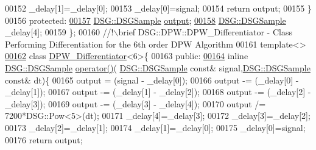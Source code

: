\begin{DoxyCode}
00152                 \_delay[1]=\_delay[0];
00153                 \_delay[0]=signal;
00154                 \textcolor{keywordflow}{return} output;
00155             \}
00156         \textcolor{keyword}{protected}:
\hypertarget{_d_p_w_8h_source_l00157}{}\hyperlink{class_d_s_g_1_1_d_p_w_1_1_d_p_w___differentiator_3_015_01_4_ae69bdfd7eb71c3c44691bda6067bda0c}{00157}             \hyperlink{namespace_d_s_g_ac39a94cd27ebcd9c1e7502d0c624894a}{DSG::DSGSample} \hyperlink{class_d_s_g_1_1_d_p_w_1_1_d_p_w___differentiator_3_015_01_4_ae69bdfd7eb71c3c44691bda6067bda0c}{output};
\hypertarget{_d_p_w_8h_source_l00158}{}\hyperlink{class_d_s_g_1_1_d_p_w_1_1_d_p_w___differentiator_3_015_01_4_afc272a1eb4f3240b4148a64c7c9ccfc1}{00158}             \hyperlink{namespace_d_s_g_ac39a94cd27ebcd9c1e7502d0c624894a}{DSG::DSGSample} \_delay[4];
00159         \};\textcolor{comment}{}
00160 \textcolor{comment}{        //!\(\backslash\)brief DSG::DPW::DPW\_Differentiator - Class Performing Differentiation for the 6th order DPW
       Algorithm}
00161 \textcolor{comment}{}        \textcolor{keyword}{template}<>
\hypertarget{_d_p_w_8h_source_l00162}{}\hyperlink{class_d_s_g_1_1_d_p_w_1_1_d_p_w___differentiator_3_016_01_4}{00162}         \textcolor{keyword}{class }\hyperlink{class_d_s_g_1_1_d_p_w_1_1_d_p_w___differentiator}{DPW\_Differentiator}<6>\{
00163         \textcolor{keyword}{public}:
\hypertarget{_d_p_w_8h_source_l00164}{}\hyperlink{class_d_s_g_1_1_d_p_w_1_1_d_p_w___differentiator_3_016_01_4_a82356846abaeef0ed76e9803a7863f3c}{00164}             \textcolor{keyword}{inline} \hyperlink{namespace_d_s_g_ac39a94cd27ebcd9c1e7502d0c624894a}{DSG::DSGSample} \hyperlink{class_d_s_g_1_1_d_p_w_1_1_d_p_w___differentiator_3_016_01_4_a82356846abaeef0ed76e9803a7863f3c}{operator()}(
      \hyperlink{namespace_d_s_g_ac39a94cd27ebcd9c1e7502d0c624894a}{DSG::DSGSample} \textcolor{keyword}{const}& signal,\hyperlink{namespace_d_s_g_ac39a94cd27ebcd9c1e7502d0c624894a}{DSG::DSGSample} \textcolor{keyword}{const}& dt)\{
00165                 output  = (signal - \_delay[0]);
00166                 output -= (\_delay[0] - \_delay[1]);
00167                 output -= (\_delay[1] - \_delay[2]);
00168                 output -= (\_delay[2] - \_delay[3]);
00169                 output -= (\_delay[3] - \_delay[4]);
00170                 output /= 7200*DSG::Pow<5>(dt);
00171                 \_delay[4]=\_delay[3];
00172                 \_delay[3]=\_delay[2];
00173                 \_delay[2]=\_delay[1];
00174                 \_delay[1]=\_delay[0];
00175                 \_delay[0]=signal;
00176                 \textcolor{keywordflow}{return} output;

\end{DoxyCode}
